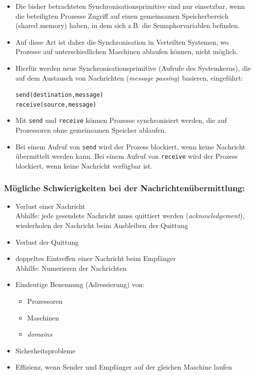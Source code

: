 \documentclass[11pt]{article}
\begin{document}
\begin{itemize}
\item Die bisher betrachteten Synchronisationsprimitive sind nur
einsetzbar, wenn die beteiligten Prozesse Zugriff auf einen
gemeinsamen Speicherbereich (shared memory) haben, in dem sich
z.B. die Semaphorvariablen befinden.
\item Auf diese Art ist daher die Synchronisation in Verteilten Systemen,
wo Prozesse auf unterschiedlichen Maschinen ablaufen können, nicht
möglich.
\item Hierfür werden neue Synchronisationsprimitive (Aufrufe des
Systemkerns), die auf dem Austausch von Nachrichten (\emph{message
passing}) basieren, eingeführt:

\texttt{send(destination,message)} \\
\texttt{receive(source,message)}
\end{itemize}
\begin{itemize}
\item Mit \texttt{send} und \texttt{receive} können Prozesse synchronisiert werden, die
auf Prozessoren ohne gemeinsamen Speicher ablaufen.
\item Bei einem Aufruf von \texttt{send} wird der Prozess blockiert, wenn keine
Nachricht übermittelt werden kann. Bei einem Aufruf von \texttt{receive}
wird der Prozess blockiert, wenn keine Nachricht verfügbar ist.
\end{itemize}

\subsubsection*{Mögliche Schwierigkeiten bei der Nachrichtenübermittlung:}
\label{sec:orgc797bef}

\begin{itemize}
\item Verlust einer Nachricht\\
Abhilfe: jede gesendete Nachricht muss quittiert werden
(\emph{acknowledgement}), wiederholen der Nachricht beim Ausbleiben der
Quittung
\item Verlust der Quittung
\item doppeltes Eintreffen einer Nachricht beim Empfänger\\
Abhilfe: Numerieren der Nachrichten
\item Eindeutige Benennung (Adressierung) von:
\begin{itemize}
\item Prozessoren
\item Maschinen
\item \emph{domains}
\end{itemize}
\item Sicherheitsprobleme
\item Effizienz, wenn Sender und Empfänger auf der gleichen Maschine laufen
\end{itemize}
\end{document}

